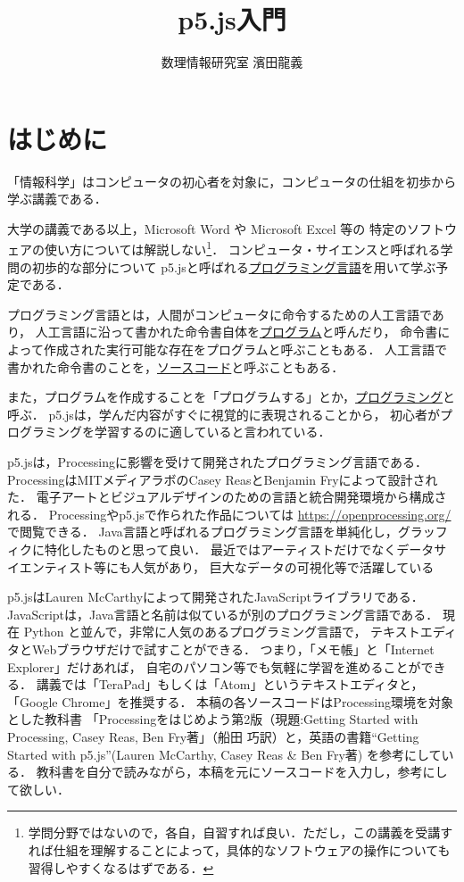 \documentclass[a4j]{ltjsarticle}
\title{p5.js入門}
\author{数理情報研究室 濱田龍義}
\begin{document}
\maketitle
\newpage
\section{はじめに}
「情報科学」はコンピュータの初心者を対象に，コンピュータの仕組を初歩から学ぶ講義である．

大学の講義である以上，Microsoft Word や Microsoft Excel 等の
特定のソフトウェアの使い方については解説しない\footnote{学問分野ではないので，各自，自習すれば良い．ただし，この講義を受講すれば仕組を理解することによって，具体的なソフトウェアの操作についても習得しやすくなるはずである．}．
コンピュータ・サイエンスと呼ばれる学問の初歩的な部分について
p5.jsと呼ばれる\underline{プログラミング言語}を用いて学ぶ予定である．

プログラミング言語とは，人間がコンピュータに命令するための人工言語であり，
人工言語に沿って書かれた命令書自体を\underline{プログラム}と呼んだり，
命令書によって作成された実行可能な存在をプログラムと呼ぶこともある．
人工言語で書かれた命令書のことを，\underline{ソースコード}と呼ぶこともある．

また，プログラムを作成することを「プログラムする」とか，\underline{プログラミング}と呼ぶ．
p5.jsは，学んだ内容がすぐに視覚的に表現されることから，
初心者がプログラミングを学習するのに適していると言われている．

p5.jsは，Processingに影響を受けて開発されたプログラミング言語である．
ProcessingはMITメディアラボのCasey ReasとBenjamin Fryによって設計された．
電子アートとビジュアルデザインのための言語と統合開発環境から構成される．
Processingやp5.jsで作られた作品については \url{https://openprocessing.org/}
で閲覧できる．
Java言語と呼ばれるプログラミング言語を単純化し，グラッフィクに特化したものと思って良い．
最近ではアーティストだけでなくデータサイエンティスト等にも人気があり，
巨大なデータの可視化等で活躍している

p5.jsはLauren McCarthyによって開発されたJavaScriptライブラリである．
JavaScriptは，Java言語と名前は似ているが別のプログラミング言語である．
現在 Python と並んで，非常に人気のあるプログラミング言語で，
テキストエディタとWebブラウザだけで試すことができる．
つまり，「メモ帳」と「Internet Explorer」だけあれば，
自宅のパソコン等でも気軽に学習を進めることができる．
講義では「TeraPad」もしくは「Atom」というテキストエディタと，「Google Chrome」を推奨する．
本稿の各ソースコードはProcessing環境を対象とした教科書
「Processingをはじめよう第2版（現題:Getting Started with Processing, Casey Reas, Ben Fry著」（船田 巧訳）と，英語の書籍``Getting Started with p5.js''(Lauren McCarthy, Casey Reas \& Ben Fry著) を参考にしている．
教科書を自分で読みながら，本稿を元にソースコードを入力し，参考にして欲しい．
\end{document}

